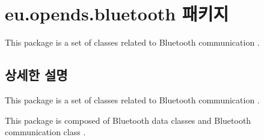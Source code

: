 \hypertarget{namespaceeu_1_1opends_1_1bluetooth}{}\section{eu.\+opends.\+bluetooth 패키지}
\label{namespaceeu_1_1opends_1_1bluetooth}


This package is a set of classes related to Bluetooth communication .  




\subsection{상세한 설명}
This package is a set of classes related to Bluetooth communication . 

This package is composed of Bluetooth data classes and Bluetooth communication class . 